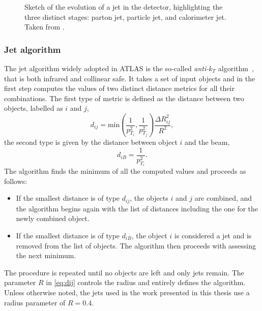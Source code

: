 
\FloatBarrier
\begin{figure}
    \caption{Sketch of the evolution of a jet in the detector, highlighting the three distinct stages: parton jet, particle jet, and calorimeter jet. Taken from .}
    \label{fig:jet-evolution}
\end{figure}

\subsubsection{Jet algorithm}
\label{subsubsec:jet-algorithm}
The jet algorithm widely adopted in ATLAS is the so-called \emph{anti-$k_T$} algorithm~\cite{Cacciari:2008gp}, that is both infrared and collinear safe.
It takes a set of input objects and in the first step computes the values of two distinct distance metrics for all their combinations.
The first type of metric is defined as the distance between two objects, labelled as $i$ and $j$,
\begin{equation}
    d_{ij} = \text{min}\left(\frac{1}{p_{T_i}^2},\frac{1}{p_{T_j}^2}\right) \frac{\Delta R_{ij}^2}{R^2},
    \label{eq:dij}
\end{equation}
the second type is given by the distance between object $i$ and the beam,
\begin{equation}
    d_{iB} = \frac{1}{p_{T_i}^2}.
\end{equation}
The algorithm finds the minimum of all the computed values and proceeds as follows:
\begin{itemize}
    \item If the smallest distance is of type $d_{ij}$, the objects $i$ and $j$ are combined, and the algorithm begins again with the list of distances including the one for the newly combined object.
    \item If the smallest distance is of type $d_{iB}$, the object $i$ is considered a jet and is removed from the list of objects. The algorithm then proceeds with assessing the next minimum.
\end{itemize}
The procedure is repeated until no objects are left and only jets remain.
The parameter $R$ in \cref{eq:dij} controls the radius and entirely defines the algorithm.
Unless otherwise noted, the jets used in the work presented in this thesis use a radius parameter of $R = 0.4$.


